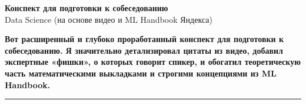 \documentclass[12pt]{article}
\begin{document}
\begin{center}
    {\huge\bfseries\color{primary} Конспект для подготовки к собеседованию} \\
    \vspace{0.5em}
    {\large Data Science (на основе видео и ML Handbook Яндекса)}
\end{center}

\vspace{1em}
\noindent \textbf{Вот расширенный и глубоко проработанный конспект для подготовки к собеседованию. Я значительно детализировал цитаты из видео, добавил экспертные «фишки», о которых говорит спикер, и обогатил теоретическую часть математическими выкладками и строгими концепциями из ML Handbook.}

\hrule
\vspace{1.5em}
\end{document}
